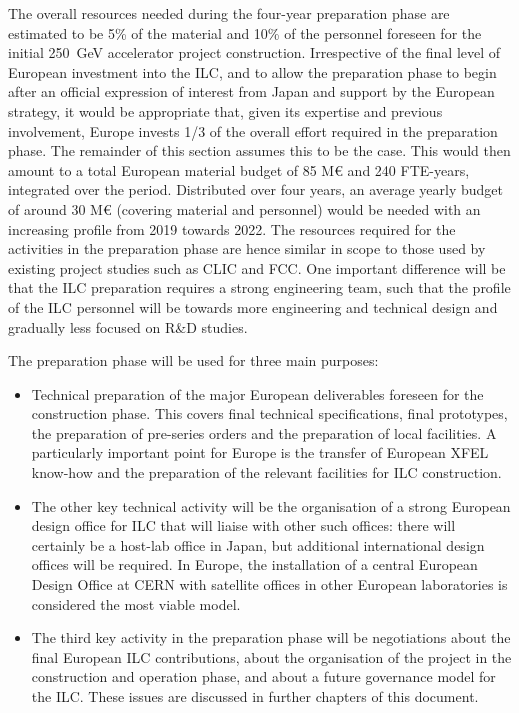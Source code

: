 \documentclass[%
 reprint,
 amsmath,amssymb,
 aps,
]{revtex4-1}
\begin{document}
The overall resources needed during the four-year preparation phase are estimated to be 5\% of the material and 10\% of the personnel 
foreseen for the initial 250~GeV accelerator project construction. Irrespective of the final level of European investment into the ILC, 
and to allow the preparation phase to begin after an official expression of interest from Japan and support by the European strategy, 
it would be appropriate that, given its expertise and previous involvement, Europe invests 1/3 of the overall effort required in the 
preparation phase. The remainder of this section assumes this to be the case. This would then amount to a total European material 
budget of 85 M\euro{} and 240 FTE-years, integrated over the period.
Distributed over four years, an average yearly budget of around 30 M\euro{} (covering material and personnel) would be needed with an 
increasing profile from 2019 towards 2022. The resources required for the activities in the preparation phase are hence similar in 
scope to those used by existing project studies such as CLIC and FCC. One important difference will be that the ILC preparation 
requires a strong engineering team, such that the profile of the ILC personnel will be towards more engineering and technical 
design and gradually less focused on R\&D studies.

The preparation phase will be used for three main purposes:

\begin{itemize}
\item 
Technical preparation of the major European deliverables foreseen for the construction phase. 
This covers final technical specifications, final prototypes, the preparation of pre-series orders and the preparation of local 
facilities. A particularly important point for Europe is the transfer of European XFEL know-how and the preparation of the 
relevant facilities for ILC construction.
\item
The other key technical activity will be the organisation of a strong European design office for ILC that will liaise with 
other such offices: there will certainly be a host-lab office in Japan, but additional international design offices will be 
required. In Europe, the installation of a central European Design Office at CERN with satellite offices in other European laboratories is considered the most viable model.
\item 
The third key activity in the preparation phase will be negotiations about the final European ILC contributions, about the 
organisation of the project in the construction and operation phase, and about a future governance model for the ILC. These issues are discussed in further chapters of this document.
\end{itemize}
\end{document}
